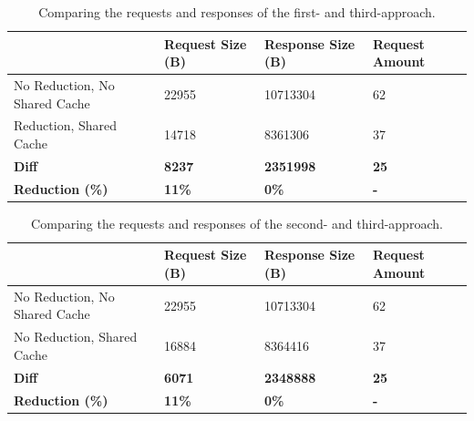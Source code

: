 \begin{table}[H]
    \begin{tabular}{|l|l|l|l|}
    \hline
                                    & Request Size (B) & Response Size (B) & Request Amount  \\
    \hline
     No Reduction, No Shared Cache     &  22955        &  10713304   & 62 \\
     \hline
     Reduction, Shared Cache        &  14718        &  8361306   & 37 \\
     \hline
     \hline
    \textbf{Diff}                   & \textbf{8237} & \textbf{2351998} & \textbf{25} \\
    \hline
    \textbf{Reduction (\%)} & \textbf{11\%} & \textbf{0\%} & \textbf{-} \\
     \hline
    \end{tabular}
    \caption{Comparing the requests and responses of the first- and third-approach.}
    \label{table:results:size-comparison-first-path-no-cache-no-reduction-cache-reduction}
\end{table}

\begin{table}[H]
    \begin{tabular}{|l|l|l|l|}
    \hline
                                    & Request Size (B) & Response Size (B) & Request Amount  \\
    \hline
     No Reduction, No Shared Cache     &  22955        &  10713304   & 62 \\
     \hline
     No Reduction, Shared Cache        &  16884        &  8364416   & 37 \\
     \hline
     \hline
    \textbf{Diff}                   & \textbf{6071} & \textbf{2348888} & \textbf{25} \\
    \hline
    \textbf{Reduction (\%)} & \textbf{11\%} & \textbf{0\%} & \textbf{-} \\
     \hline
    \end{tabular}
    \caption{Comparing the requests and responses of the second- and third-approach.}
    \label{table:results:size-comparison-first-path-cache-no-reduction-cache-reduction}
\end{table}
